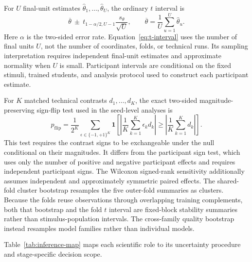 For \(U\) final-unit estimates \(\widehat\theta_1,\ldots,\widehat\theta_U\), the ordinary \(t\) interval is
\begin{equation}
  \overline{\theta}
  \ \pm\
  t_{1-\alpha/2,U-1}
  \frac{s_\theta}{\sqrt U},
  \qquad
  \overline{\theta}=\frac{1}{U}\sum_{u=1}^{U}\widehat\theta_u.
  \label{eq:t-interval}
\end{equation}
Here \(\alpha\) is the two-sided error rate.
Equation~\ref{eq:t-interval} uses the number of final units \(U\), not the number of coordinates, folds, or technical runs.
Its sampling interpretation requires independent final-unit estimates and approximate normality when \(U\) is small.
Participant intervals are conditional on the fixed stimuli, trained students, and analysis protocol used to construct each participant estimate.

For \(K\) matched technical contrasts \(d_1,\ldots,d_K\), the exact two-sided magnitude-preserving sign-flip test used in the seed-level analyses is
\begin{equation}
  p_{\mathrm{flip}}
  =
  \frac{1}{2^K}
  \sum_{\epsilon\in\{-1,+1\}^K}
  \mathbf 1\!\left[
    \left|\frac{1}{K}\sum_{k=1}^{K}\epsilon_kd_k\right|
    \ge
    \left|\frac{1}{K}\sum_{k=1}^{K}d_k\right|
  \right].
  \label{eq:sign-flip}
\end{equation}
This test requires the contrast signs to be exchangeable under the null conditional on their magnitudes.
It differs from the participant sign test, which uses only the number of positive and negative participant effects and requires independent participant signs.
The Wilcoxon signed-rank sensitivity additionally assumes independent and approximately symmetric paired effects.
The shared-fold cluster bootstrap resamples the five outer-fold summaries as clusters.
Because the folds reuse observations through overlapping training complements, both that bootstrap and the fold \(t\) interval are fixed-block stability summaries rather than stimulus-population intervals.
The cross-family quality bootstrap instead resamples model families rather than individual models.

Table~\ref{tab:inference-map} maps each scientific role to its uncertainty procedure and stage-specific decision scope.

